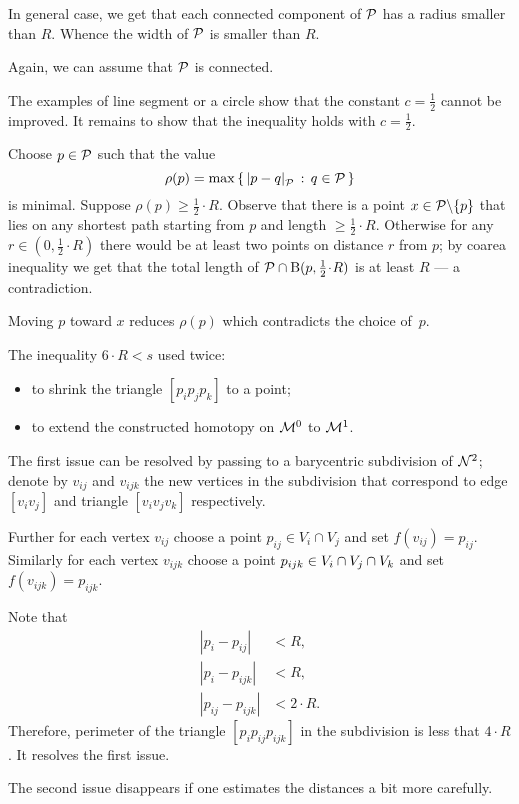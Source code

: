 In general case, we get that each connected component of $\mathcal{P}$ has a radius smaller than $R$.
Whence the width of $\mathcal{P}$ is smaller than $R$.

 Again, we can assume that $\mathcal{P}$ is connected.

The examples of line segment or a circle show that the constant $c=\tfrac12$ cannot be improved.
It remains to show that the inequality holds with $c=\tfrac12$.

Choose $p\in\mathcal{P}$ such that the value
\[\rho(p)=\max\set{\dist{p}{q}{\spc{P}}}{q\in\spc{P}}\]
is minimal.
Suppose $\rho(p)\ge\tfrac 12\cdot R$.
Observe that there is a point $x\z\in \spc{P}\backslash\{p\}$ that lies on any shortest path starting from $p$ and length $\ge\tfrac 12\cdot R$.
Otherwise for any $r\in(0,\tfrac 12\cdot R)$ there would be at least two points on distance $r$ from $p$;
by coarea inequality we get that the total length of $\spc{P}\cap \oBall(p,\tfrac 12\cdot R)$ is at least $R$ --- a contradiction.

Moving $p$ toward $x$ reduces $\rho(p)$ which contradicts the choice of~$p$.

The inequality $6\cdot R<s$ used twice:
\begin{itemize}
\item to shrink the triangle $[p_ip_jp_k]$ to a point;
\item to extend the constructed homotopy on $\mathcal{M}^0$ to $\mathcal{M}^1$.
\end{itemize}

The first issue can be resolved by passing to a barycentric subdivision of $\mathcal{N}^2$;
denote by $v_{ij}$ and $v_{ijk}$ the new vertices in the subdivision that correspond to edge $[v_iv_j]$ and triangle $[v_iv_jv_k]$ respectively.

Further for each vertex $v_{ij}$ choose a point $p_{ij}\in V_i\cap V_j$ and set $f(v_{ij})=p_{ij}$.
Similarly for each vertex $v_{ijk}$ choose a point $p_{ijk}\z\in V_i\cap V_j\cap V_k$ and set $f(v_{ijk})=p_{ijk}$.

Note that 
\begin{align*}
|p_i-p_{ij}|&<R,
\\
|p_i-p_{ijk}|&<R,
\\
|p_{ij}-p_{ijk}|&<2\cdot R.
\end{align*}
Therefore, perimeter of the triangle $[p_ip_{ij}p_{ijk}]$ in the subdivision is less that $4\cdot R$.
It resolves the first issue.

The second issue disappears if one estimates the distances a bit more carefully.
 
